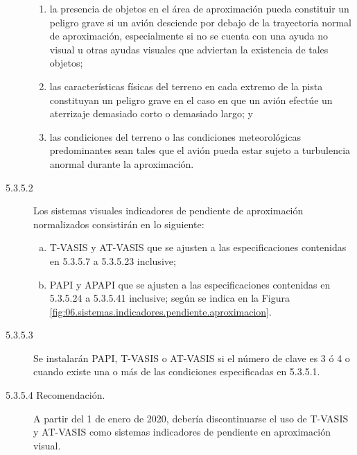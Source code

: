 \begin{tcolorbox}[title=Requerimientos OACI. Anexo 14. Volumen I. Edición 2018.\\
  5.3.5 Sistemas visuales indicadores de pendiente de aproximación 
  (Continuación)
  ]

  {\footnotesize

    \begin{description}
      
    \item[   ] 
    \begin{enumerate}

       \item la presencia de objetos en el área de aproximación pueda constituir un peligro grave si un avión desciende por debajo de la trayectoria normal de aproximación, especialmente si no se cuenta con una ayuda no visual u otras ayudas visuales que adviertan la existencia de tales objetos;

       \item las características físicas del terreno en cada extremo de la pista constituyan un peligro grave en el caso en que un avión efectúe un aterrizaje demasiado corto o demasiado largo; y

       \item las condiciones del terreno o las condiciones meteorológicas predominantes sean tales que el avión pueda estar sujeto a turbulencia anormal durante la aproximación.
         
\end{enumerate}

\item[5.3.5.2] Los sistemas visuales indicadores de pendiente de aproximación normalizados consistirán en lo siguiente:

  \begin{enumerate}[a)]

  \item  T-VASIS y AT-VASIS que se ajusten a las especificaciones
    contenidas en 5.3.5.7 a 5.3.5.23 inclusive; 

  \item PAPI y APAPI que se
    ajusten a las especificaciones contenidas en 5.3.5.24 a 5.3.5.41
    inclusive; según se indica en la Figura \ref{fig:06.sistemas.indicadores.pendiente.aproximacion}.
    
  \end{enumerate}
  
\item [5.3.5.3] Se instalarán PAPI, T-VASIS o AT-VASIS si el número de clave es 3 ó 4 o cuando existe una o más de las condiciones especificadas en 5.3.5.1.

\item [5.3.5.4 Recomendación.] A partir del 1 de enero de 2020,
    debería discontinuarse el uso de T-VASIS y AT-VASIS como sistemas
    indicadores de pendiente en aproximación visual.
  
    \end{description}
}


\end{tcolorbox}


